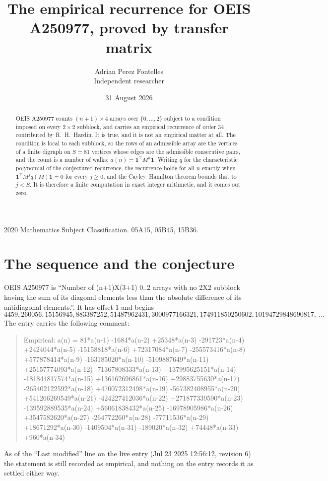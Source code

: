 \documentclass[11pt,a4paper]{article}
\title{The empirical recurrence for OEIS A250977, proved by transfer matrix}
\author{Adrian Perez Fontelles\\ \small Independent researcher}
\date{31 August 2026}
\theoremstyle{plain}
\theoremstyle{definition}
\begin{document}
\maketitle

\begin{abstract}
OEIS A250977 counts $(n+1)\times4$ arrays over $\{0,\dots,2\}$ subject to a condition imposed on
every $2\times2$ subblock, and carries an empirical recurrence of order $34$ contributed
by R.~H.~Hardin. It is true, and it is not an empirical matter at all. The condition is local
to each subblock, so the rows of an admissible array are the vertices of a finite digraph
on $S=81$ vertices whose edges are the admissible consecutive pairs, and the count is a
number of walks: $a(n)=\mathbf{1}^{\!\top}M^{n}\mathbf{1}$. Writing $q$
for the characteristic polynomial of the conjectured recurrence, the recurrence holds for all
$n$ exactly when $\mathbf{1}^{\!\top}M^{j}q(M)\mathbf{1}=0$ for every $j\ge0$, and the
Cayley--Hamilton theorem bounds that to $j<S$. It is therefore a finite computation in exact
integer arithmetic, and it comes out zero.
\end{abstract}

\noindent\small 2020 Mathematics Subject Classification. 05A15, 05B45, 15B36.\normalsize

\section{The sequence and the conjecture}

OEIS A250977 is ``Number of (n+1)X(3+1) 0..2 arrays with no 2X2 subblock having the sum of its diagonal elements less than the absolute difference of its antidiagonal elements.''. It has offset $1$ and begins
\[
4459, 260056, 15156945, 883387252, 51487962431, 3000977166321, 174911850250602, 10194729848690817,\ \dots
\]
The entry carries the following comment:
\begin{quote}\small
Empirical: a(n) = 81*a(n-1) -1684*a(n-2) +25348*a(n-3) -291723*a(n-4) +2424044*a(n-5) -15158818*a(n-6) +72317084*a(n-7) -255573416*a(n-8) +577878414*a(n-9) -163185020*a(n-10) -5109887649*a(n-11) +25157774093*a(n-12) -71367808333*a(n-13) +137995625151*a(n-14) -181844817574*a(n-15) +136162696861*a(n-16) +29883755630*a(n-17) -265402122592*a(n-18) +470072312498*a(n-19) -567382408955*a(n-20) +541266269549*a(n-21) -424227412036*a(n-22) +271877339590*a(n-23) -139592889535*a(n-24) +56061838432*a(n-25) -16978905986*a(n-26) +3547582620*a(n-27) -264772260*a(n-28) -77711536*a(n-29) +18671292*a(n-30) -1409504*a(n-31) -189020*a(n-32) +74448*a(n-33) +960*a(n-34)
\end{quote}
As of the ``Last modified'' line on the live entry (Jul 23 2025 12:56:12, revision 6) the statement is
still recorded as empirical, and nothing on the entry records it as settled either way.
\end{document}
